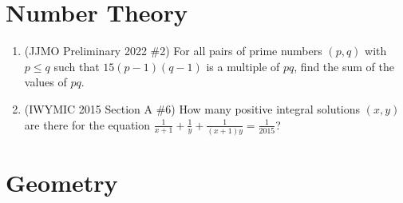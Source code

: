 \documentclass[11pt,letterpaper]{article}
\begin{document}
\section*{Number Theory}

\begin{enumerate}[resume]
    \item (JJMO Preliminary 2022 \#2) For all pairs of prime numbers $(p,q)$ with $p\le q$ such that $15(p-1)(q-1)$ is a multiple of $pq$, find the sum of the values of $pq$.

    \item (IWYMIC 2015 Section A \#6) How many positive integral solutions $(x, y)$ are there for the equation $\frac{1}{x+1}+\frac{1}{y}+\frac{1}{(x+1)y}=\frac{1}{2015}$?
\end{enumerate}

\section*{Geometry}
\end{document}
